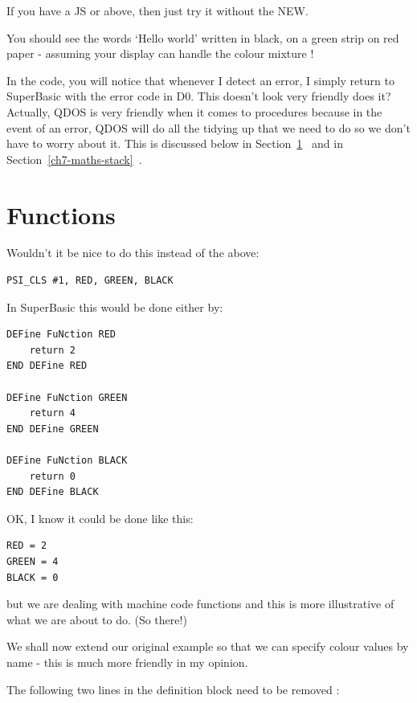 If you have a JS or above, then just try it without the NEW.

You should see the words `Hello world' written in black, on a green
    strip on red paper -{} assuming your display can handle the colour mixture
   !

In the code, you will notice that whenever I detect an error, I
    simply return to SuperBasic with the error code in D0. This doesn't look
    very friendly does it? Actually, QDOS is very friendly when it comes to
    procedures because in the event of an error, QDOS will do all the tidying
    up that we need to do so we don't have to worry about it. This is
    discussed below in Section~\ref{ch7-functions}~ and in Section~\ref{ch7-maths-stack}~.

\section{Functions}
\label{ch7-functions}%

Wouldn't it be nice to do this instead of the above:

\begin{lstlisting}[firstnumber=1,]
PSI_CLS #1, RED, GREEN, BLACK
\end{lstlisting}

In SuperBasic this would be done either by:

\begin{lstlisting}[firstnumber=1,]
DEFine FuNction RED
    return 2
END DEFine RED

DEFine FuNction GREEN
    return 4
END DEFine GREEN

DEFine FuNction BLACK
    return 0
END DEFine BLACK
\end{lstlisting}

OK, I know it could be done like this:

\begin{lstlisting}[firstnumber=1,]
RED = 2
GREEN = 4
BLACK = 0
\end{lstlisting}

but we are dealing with machine code functions and this is more
    illustrative of what we are about to do. (So there!)

We shall now extend our original example so that we can specify
    colour values by name -{} this is much more friendly in my opinion.

The following two lines in the definition block need to be removed
   :

